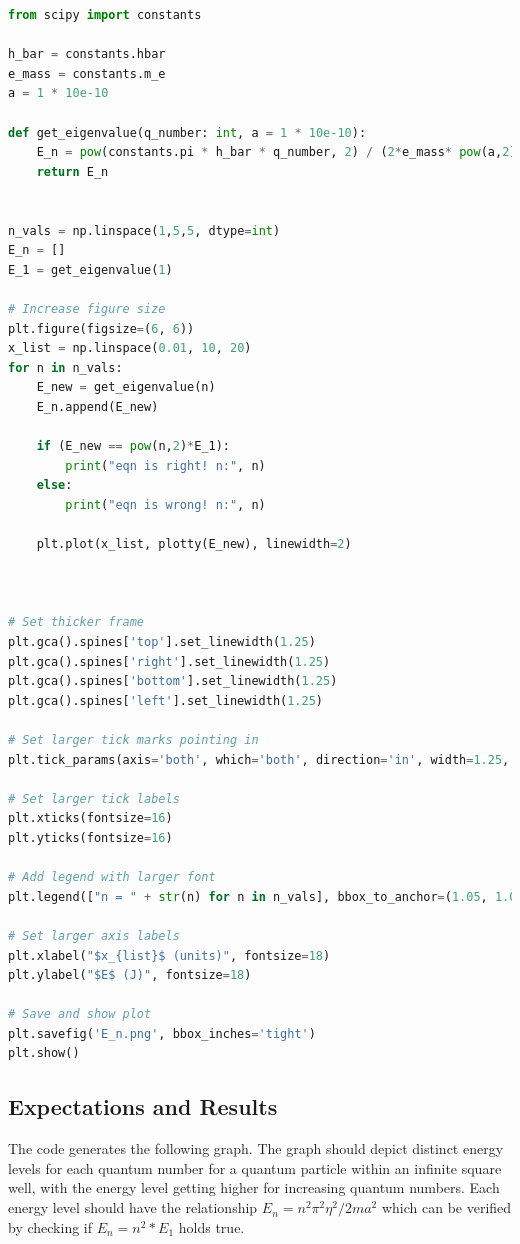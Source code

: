 \documentclass[a4paper,12pt]{article}
\begin{document}
\begin{lstlisting}[language=Python, caption= Code used to obtain E_n values]
    from scipy import constants

h_bar = constants.hbar
e_mass = constants.m_e
a = 1 * 10e-10

def get_eigenvalue(q_number: int, a = 1 * 10e-10):
    E_n = pow(constants.pi * h_bar * q_number, 2) / (2*e_mass* pow(a,2)) 
    return E_n


n_vals = np.linspace(1,5,5, dtype=int)
E_n = []
E_1 = get_eigenvalue(1)

# Increase figure size
plt.figure(figsize=(6, 6))
x_list = np.linspace(0.01, 10, 20)
for n in n_vals:
    E_new = get_eigenvalue(n)
    E_n.append(E_new)
    
    if (E_new == pow(n,2)*E_1):
        print("eqn is right! n:", n)
    else:
        print("eqn is wrong! n:", n)

    plt.plot(x_list, plotty(E_new), linewidth=2)



# Set thicker frame
plt.gca().spines['top'].set_linewidth(1.25)
plt.gca().spines['right'].set_linewidth(1.25)
plt.gca().spines['bottom'].set_linewidth(1.25)
plt.gca().spines['left'].set_linewidth(1.25)

# Set larger tick marks pointing in
plt.tick_params(axis='both', which='both', direction='in', width=1.25, size = 6)

# Set larger tick labels
plt.xticks(fontsize=16)
plt.yticks(fontsize=16)

# Add legend with larger font
plt.legend(["n = " + str(n) for n in n_vals], bbox_to_anchor=(1.05, 1.0), loc='upper left', fontsize=16)

# Set larger axis labels
plt.xlabel("$x_{list}$ (units)", fontsize=18)
plt.ylabel("$E$ (J)", fontsize=18)

# Save and show plot
plt.savefig('E_n.png', bbox_inches='tight')
plt.show()
\end{lstlisting}
\subsection{Expectations and Results}
The code generates the following graph. The graph should depict distinct energy levels for each quantum number for a quantum particle within an infinite square well, with the energy level getting higher for increasing quantum numbers. Each energy level should have the relationship \(E_n = n^2 \pi^2 \eta^2 / 2ma^2\)\cite{griffith} which can be verified by checking if \(E_n = n^2 * E_1 \) holds true. 
\end{document}
